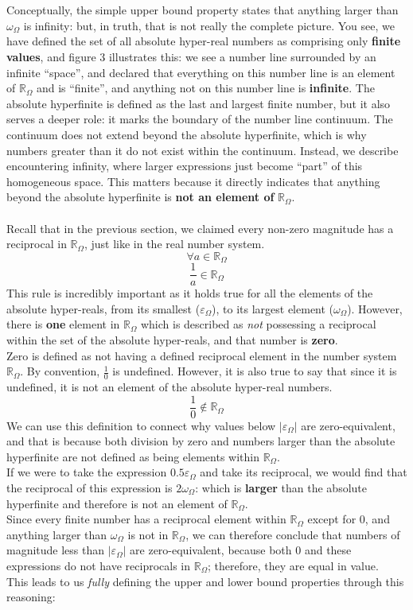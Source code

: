 \documentclass{article}
\begin{document}
\\\\Conceptually, the simple upper bound property states that anything larger than $\omega_\Omega$ is infinity: but, in truth, that is not really the complete picture. You see, we have defined the set of all absolute hyper-real numbers as comprising only \textbf{finite values}, and figure 3 illustrates this: we see a number line surrounded by an infinite ``space'', and declared that everything on this number line is an element of $\mathbb{R}_\Omega$ and is ``finite'', and anything not on this number line is \textbf{infinite}. The absolute hyperfinite is defined as the last and largest finite number, but it also serves a deeper role: it marks the boundary of the number line continuum. The continuum does not extend beyond the absolute hyperfinite, which is why numbers greater than it do not exist within the continuum. Instead, we describe encountering infinity, where larger expressions just become ``part'' of this homogeneous space. This matters because it directly indicates that anything beyond the absolute hyperfinite is \textbf{not an element of }$\mathbb{R}_\Omega$. \\\\Recall that in the previous section, we claimed every non-zero magnitude has a reciprocal in $\mathbb{R}_\Omega$, just like in the real number system.$$\forall a \in \mathbb{R}_\Omega$$ $$\frac{1}{a} \in \mathbb{R}_\Omega$$This rule is incredibly important as it holds true for all the elements of the absolute hyper-reals, from its smallest ($\varepsilon_\Omega$), to its largest element ($\omega_\Omega$). However, there is \textbf{one} element in $\mathbb{R}_\Omega$ which is described as \textit{not} possessing a reciprocal within the set of the absolute hyper-reals, and that number is \textbf{zero}.
\\Zero is defined as not having a defined reciprocal element in the number system $\mathbb{R}_\Omega$. By convention, $\frac{1}{0}$ is undefined. However, it is also true to say that since it is undefined, it is not an element of the absolute hyper-real numbers.
$$\frac{1}{0} \notin \mathbb{R}_\Omega$$We can use this definition to connect why values below $|\varepsilon_\Omega|$ are zero-equivalent, and that is because both division by zero and numbers larger than the absolute hyperfinite are not defined as being elements within $\mathbb{R}_\Omega$.\\If we were to take the expression $0.5\varepsilon_\Omega$ and take its reciprocal, we would find that the reciprocal of this expression is $2\omega_\Omega$: which is \textbf{larger} than the absolute hyperfinite and therefore is not an element of $\mathbb{R}_\Omega$.\\Since every finite number has a reciprocal element within $\mathbb{R}_\Omega$ except for $0$, and anything larger than $\omega_\Omega$ is not in $\mathbb{R}_\Omega$, we can therefore conclude that numbers of magnitude less than $|\varepsilon_\Omega|$ are zero-equivalent, because both $0$ and these expressions do not have reciprocals in $\mathbb{R}_\Omega$; therefore, they are equal in value.\\This leads to us \textit{fully} defining the upper and lower bound properties through this reasoning:
\end{document}
